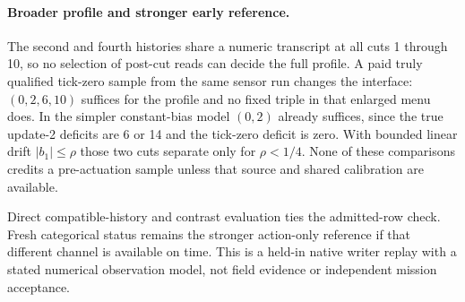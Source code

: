 \documentclass{article}
\begin{document}
\paragraph{Broader profile and stronger early reference.}
The second and fourth histories share a numeric transcript at
all cuts 1 through 10, so no selection of post-cut reads can
decide the full profile. A paid truly qualified tick-zero sample
from the same sensor run changes the interface: $(0,2,6,10)$
suffices for the profile and no fixed triple in that enlarged
menu does. In the simpler constant-bias model $(0,2)$ already
suffices, since the true update-2 deficits are 6 or 14 and
the tick-zero deficit is zero. With bounded linear drift
$|b_1|\le\rho$ those two cuts separate only for $\rho<1/4$.
None of these comparisons credits a pre-actuation sample
unless that source and shared calibration are available.

Direct compatible-history and contrast evaluation ties the
admitted-row check. Fresh categorical status remains the
stronger action-only reference if that different channel is
available on time. This is a held-in native writer replay
with a stated numerical observation model, not field evidence
or independent mission acceptance.
\end{document}

